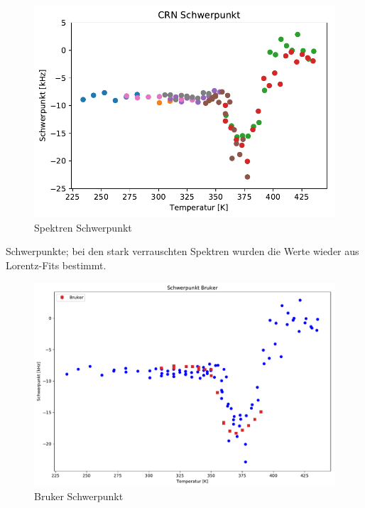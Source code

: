 \begin{figure}
	\begin{center}
		\includegraphics[width=\textwidth]{graphics/plots/SPEK/spek_mean.pdf} 
	\end{center}
	\caption{Spektren Schwerpunkt} \label{fig:res:spek_mean}
\end{figure}
Schwerpunkte; bei den stark verrauschten Spektren wurden die Werte wieder aus Lorentz-Fits bestimmt.

\begin{figure}
	\begin{center}
		\includegraphics[width=\textwidth]{graphics/plots/BRUKER/bruker_mean.pdf} 
	\end{center}
	\caption{Bruker Schwerpunkt} \label{fig:res:bruker_mean}
\end{figure}


